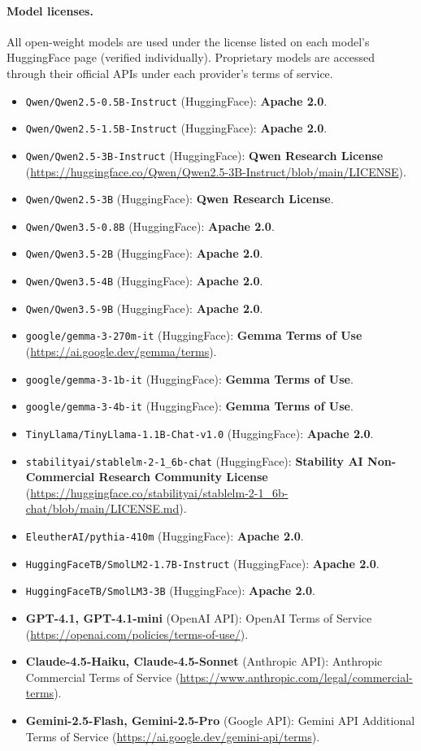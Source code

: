 \documentclass[11pt]{article}
\begin{document}
\paragraph{Model licenses.}
All open-weight models are used under the license listed on each
model's HuggingFace page (verified individually). Proprietary
models are accessed through their official APIs under each
provider's terms of service.

\begin{itemize}\setlength\itemsep{0pt}
\item \texttt{Qwen/Qwen2.5-0.5B-Instruct} (HuggingFace):
  \textbf{Apache 2.0}.
\item \texttt{Qwen/Qwen2.5-1.5B-Instruct} (HuggingFace):
  \textbf{Apache 2.0}.
\item \texttt{Qwen/Qwen2.5-3B-Instruct} (HuggingFace):
  \textbf{Qwen Research License}
  (\url{https://huggingface.co/Qwen/Qwen2.5-3B-Instruct/blob/main/LICENSE}).
\item \texttt{Qwen/Qwen2.5-3B} (HuggingFace):
  \textbf{Qwen Research License}.
\item \texttt{Qwen/Qwen3.5-0.8B} (HuggingFace):
  \textbf{Apache 2.0}.
\item \texttt{Qwen/Qwen3.5-2B} (HuggingFace):
  \textbf{Apache 2.0}.
\item \texttt{Qwen/Qwen3.5-4B} (HuggingFace):
  \textbf{Apache 2.0}.
\item \texttt{Qwen/Qwen3.5-9B} (HuggingFace):
  \textbf{Apache 2.0}.
\item \texttt{google/gemma-3-270m-it} (HuggingFace):
  \textbf{Gemma Terms of Use}
  (\url{https://ai.google.dev/gemma/terms}).
\item \texttt{google/gemma-3-1b-it} (HuggingFace):
  \textbf{Gemma Terms of Use}.
\item \texttt{google/gemma-3-4b-it} (HuggingFace):
  \textbf{Gemma Terms of Use}.
\item \texttt{TinyLlama/TinyLlama-1.1B-Chat-v1.0} (HuggingFace):
  \textbf{Apache 2.0}.
\item \texttt{stabilityai/stablelm-2-1\_6b-chat} (HuggingFace):
  \textbf{Stability AI Non-Commercial Research Community License}
  (\url{https://huggingface.co/stabilityai/stablelm-2-1_6b-chat/blob/main/LICENSE.md}).
\item \texttt{EleutherAI/pythia-410m} (HuggingFace):
  \textbf{Apache 2.0}.
\item \texttt{HuggingFaceTB/SmolLM2-1.7B-Instruct} (HuggingFace):
  \textbf{Apache 2.0}.
\item \texttt{HuggingFaceTB/SmolLM3-3B} (HuggingFace):
  \textbf{Apache 2.0}.
\item \textbf{GPT-4.1, GPT-4.1-mini} (OpenAI API):
  OpenAI Terms of Service
  (\url{https://openai.com/policies/terms-of-use/}).
\item \textbf{Claude-4.5-Haiku, Claude-4.5-Sonnet} (Anthropic API):
  Anthropic Commercial Terms of Service
  (\url{https://www.anthropic.com/legal/commercial-terms}).
\item \textbf{Gemini-2.5-Flash, Gemini-2.5-Pro} (Google API):
  Gemini API Additional Terms of Service
  (\url{https://ai.google.dev/gemini-api/terms}).
\end{itemize}
\end{document}
